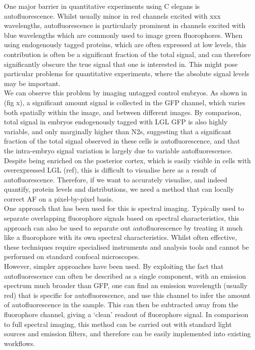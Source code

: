\documentclass[12pt]{"article"}
\begin{document}
One major barrier in quantitative experiments using C elegans is autofluorescence. Whilst usually minor in red channels excited with xxx wavelengths, autofluorescence is particularly prominent in channels excited with blue wavelengths which are commonly used to image green fluorophores. When using endogenously tagged proteins, which are often expressed at low levels, this contribution is often be a significant fraction of the total signal, and can therefore significantly obscure the true signal that one is interested in. This might pose particular problems for quantitative experiments, where the absolute signal levels may be important.\\

We can observe this problem by imaging untagged control embryos. As shown in (fig x), a significant amount signal is collected in the GFP channel, which varies both spatially within the image, and between different images. By comparison, total signal in embryos endogenously tagged with LGL GFP is also highly variable, and only marginally higher than N2s, suggesting that a significant fraction of the total signal observed in these cells is autofluorescence, and that the intra-embryo signal variation is largely due to variable autofluorescence. Despite being enriched on the posterior cortex, which is easily visible in cells with overexpressed LGL (ref), this is difficult to visualise here as a result of autofluorescence. Therefore, if we want to accurately visualise, and indeed quantify, protein levels and distributions, we need a method that can locally correct AF on a pixel-by-pixel basis.\\


One approach that has been used for this is spectral imaging. Typically used to separate overlapping fluorophore signals based on spectral characteristics, this approach can also be used to separate out autofluorescence by treating it much like a fluorophore with its own spectral characteristics. Whilst often effective, these techniques require specialised instruments and analysis tools and cannot be performed on standard confocal microscopes.\\

However, simpler approaches have been used. By exploiting the fact that autofluorescence can often be described as a single component, with an emission spectrum much broader than GFP, one can find an emission wavelength (usually red) that is specific for autofluorescence, and use this channel to infer the amount of autofluorescence in the sample. This can then be subtracted away from the fluorophore channel, giving a ‘clean’ readout of fluorophore signal. In comparison to full spectral imaging, this method can be carried out with standard light sources and emission filters, and therefore can be easily implemented into existing workflows.\\
\end{document}

